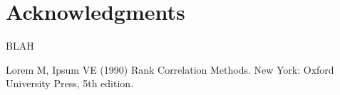 \documentclass[10pt,letterpaper]{article}
\begin{document}
\section*{Acknowledgments}
BLAH


%
%
% 
\begin{thebibliography}{10}
Lorem M, Ipsum VE (1990) Rank Correlation Methods. New York: Oxford University Press, 5th edition.

\end{thebibliography}
\end{document}

